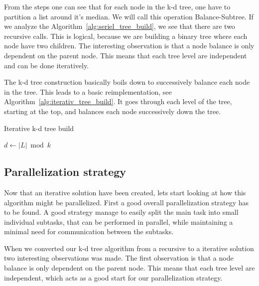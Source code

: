 From the steps one can see that for each node in the k-d tree, one have to partition a list around it's median. We will call this operation Balance-Subtree. If we analyze the Algorithm~\ref{alg:seriel_tree_build}, we see that there are two recursive calls. This is logical, because we are building a binary tree where each node have two children. The interesting observation is that a node balance is only dependent on the parent node. This means that each tree level are independent and can be done iteratively.

The k-d tree construction basically boils down to successively balance each node in the tree. This leads to a basic reimplementation, see Algorithm~\ref{alg:iterativ_tree_build}. It goes through each level of the tree, starting at the top, and balances each node successively down the tree.

\begin{algorithm}
\caption{Iterative k-d tree build}
\label{alg:iterativ_tree_build}
\begin{algorithmic}
                \State$d \gets |L| \bmod k$ 
                \State {}
            \EndFor
        \EndFor
    \EndFunction
\end{algorithmic}
\end{algorithm}

\subsection{Parallelization strategy} %
\label{ssub:parallelization_strategy}

Now that an iterative solution have been created, lets start looking at how this algorithm might be parallelized. First a good overall parallelization strategy has to be found. A good strategy manage to easily split the main task into small individual subtasks, that can be performed in parallel, while maintaining a minimal need for communication between the subtasks.

When we converted our k-d tree algorithm from a recursive to a iterative solution two interesting observations was made. The first observation is that a node balance is only dependent on the parent node. This means that each tree level are independent, which acts as a good start for our parallelization strategy.

